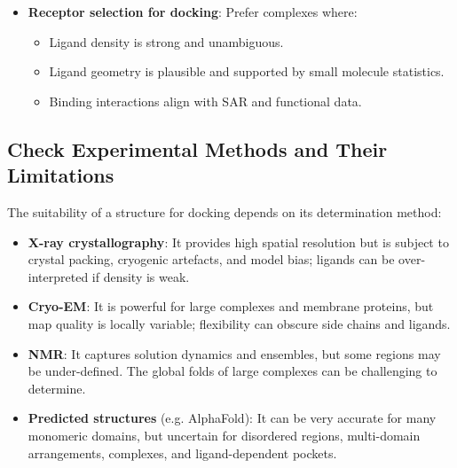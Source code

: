 \documentclass[12pt]{article}
\begin{document}
\begin{itemize}
Ligands with very high B-factors or low occupancy may represent partial binding or multiple orientations.

\item \textbf{Receptor selection for docking}: Prefer complexes where:
\begin{itemize}
  \item Ligand density is strong and unambiguous.
  \item Ligand geometry is plausible and supported by small molecule statistics.
  \item Binding interactions align with SAR and functional data.
\end{itemize}
\end{itemize}



\subsection{Check Experimental Methods and Their Limitations}
The suitability of a structure for docking depends on its determination method:

\begin{itemize}
  \item \textbf{X-ray crystallography}: It provides high spatial resolution but is subject to crystal packing, cryogenic artefacts, and model bias; ligands can be over-interpreted if density is weak.\cite{CH4_Evans2013_data_quality,CH4_karplus2012linking,CH4_chakraborti2021all}

  \item \textbf{Cryo-EM}: It is powerful for large complexes and membrane proteins, but map quality is locally variable; flexibility can obscure side chains and ligands.\cite{CH4_pintilie2021validation}

  \item \textbf{NMR}: It captures solution dynamics and ensembles, but some regions may be under-defined. The global folds of large complexes can be challenging to determine.\cite{CH4_Ulrich2008_BMRB,CH4_fowler2020method}

  \item \textbf{Predicted structures} (e.g. AlphaFold)\cite{CH4_Jumper2021_AlphaFold,CH4_Varadi2022_AlphaFoldDB}: It can be very accurate for many monomeric domains, but uncertain for disordered regions, multi-domain arrangements, complexes, and ligand-dependent pockets.
\end{itemize}
\end{document}

